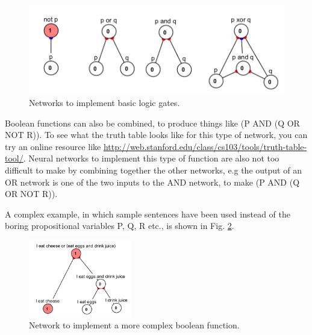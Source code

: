 \begin{figure}[h]
\centering
\includegraphics[scale=.7]{./images/logic_gates.png}
\caption[Simbrain screenshot]{Networks to implement basic logic gates.}
\label{logic_gates}
\end{figure}

Boolean functions can also be combined, to produce things like (P AND (Q OR NOT R)). To see what the truth table looks like for this type of network, you can try an online resource like \url{http://web.stanford.edu/class/cs103/tools/truth-table-tool/}. Neural networks to implement this type of function are also not too difficult to make by combining together the other networks, e.g the output of an OR network is one of the two inputs to the AND network, to make (P AND (Q OR NOT R)).

A complex example, in which sample sentences have been used instead of the boring propositional variables P, Q, R etc., is shown in Fig. \ref{logic_gates_ex}.

\begin{figure}[h]
\centering
\includegraphics[width=0.4\textwidth]{images/logic_gates_ex.png}
\caption[Simbrain screenshot]{Network to implement a more complex boolean function.}
\label{logic_gates_ex}
\end{figure}
